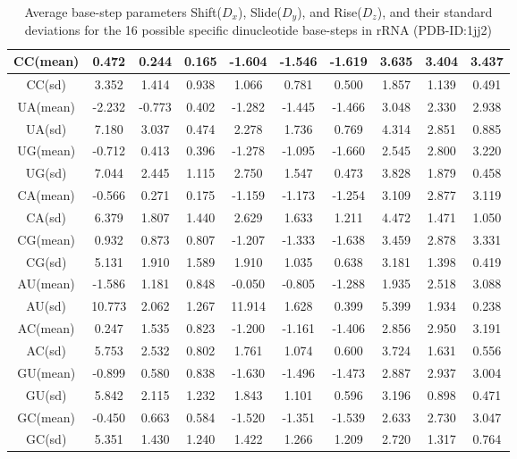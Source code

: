 \begin{table}[htbp]
\begin{center}
{\begin{tabular}{|c|c|c|c|c|c|c|c|c|c|}
CC(mean) &0.472 & 0.244 & 0.165 & -1.604 & -1.546 & -1.619 & 3.635 & 3.404 & 3.437 \\ \hline  
CC(sd)  & 3.352 & 1.414 & 0.938 & 1.066 & 0.781 & 0.500 & 1.857 & 1.139 & 0.491 \\ \hline     
UA(mean) &-2.232 & -0.773 & 0.402 & -1.282 & -1.445 & -1.466 & 3.048 & 2.330 & 2.938 \\ \hline
UA(sd)  & 7.180 & 3.037 & 0.474 & 2.278 & 1.736 & 0.769 & 4.314 & 2.851 & 0.885 \\ \hline     
UG(mean) &-0.712 & 0.413 & 0.396 & -1.278 & -1.095 & -1.660 & 2.545 & 2.800 & 3.220 \\ \hline 
UG(sd)  & 7.044 & 2.445 & 1.115 & 2.750 & 1.547 & 0.473 & 3.828 & 1.879 & 0.458 \\ \hline     
CA(mean) &-0.566 & 0.271 & 0.175 & -1.159 & -1.173 & -1.254 & 3.109 & 2.877 & 3.119 \\ \hline 
CA(sd)  & 6.379 & 1.807 & 1.440 & 2.629 & 1.633 & 1.211 & 4.472 & 1.471 & 1.050 \\ \hline     
CG(mean) &0.932 & 0.873 & 0.807 & -1.207 & -1.333 & -1.638 & 3.459 & 2.878 & 3.331 \\ \hline  
CG(sd)  & 5.131 & 1.910 & 1.589 & 1.910 & 1.035 & 0.638 & 3.181 & 1.398 & 0.419 \\ \hline     
AU(mean) &-1.586 & 1.181 & 0.848 & -0.050 & -0.805 & -1.288 & 1.935 & 2.518 & 3.088 \\ \hline 
AU(sd)  & 10.773 & 2.062 & 1.267 & 11.914 & 1.628 & 0.399 & 5.399 & 1.934 & 0.238 \\ \hline   
AC(mean) &0.247 & 1.535 & 0.823 & -1.200 & -1.161 & -1.406 & 2.856 & 2.950 & 3.191 \\ \hline  
AC(sd)  & 5.753 & 2.532 & 0.802 & 1.761 & 1.074 & 0.600 & 3.724 & 1.631 & 0.556 \\ \hline     
GU(mean) &-0.899 & 0.580 & 0.838 & -1.630 & -1.496 & -1.473 & 2.887 & 2.937 & 3.004 \\ \hline 
GU(sd)  & 5.842 & 2.115 & 1.232 & 1.843 & 1.101 & 0.596 & 3.196 & 0.898 & 0.471 \\ \hline     
GC(mean) &-0.450 & 0.663 & 0.584 & -1.520 & -1.351 & -1.539 & 2.633 & 2.730 & 3.047 \\ \hline 
GC(sd)  & 5.351 & 1.430 & 1.240 & 1.422 & 1.266 & 1.209 & 2.720 & 1.317 & 0.764 \\ \hline       
\end{tabular}
}
\caption{Average base-step parameters Shift($D_x$), Slide($D_y$), and
Rise($D_z$), and their standard deviations for the 
16 possible specific dinucleotide base-steps in rRNA (PDB-ID:1jj2)}
\label{tab:average1}
\end{center}
\end{table}



